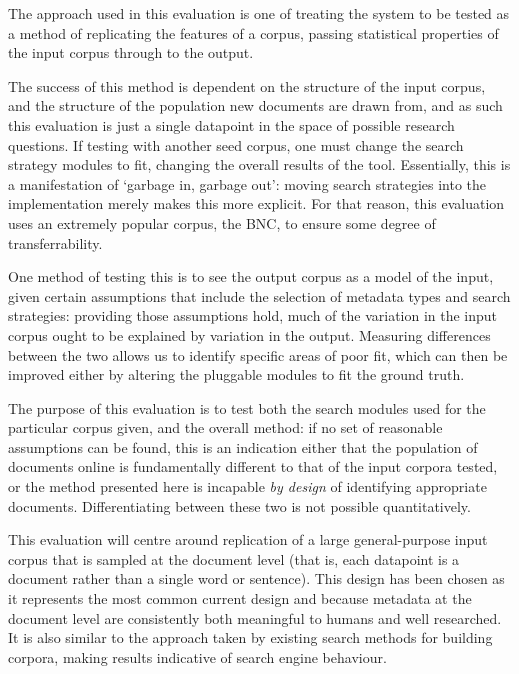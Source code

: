 

The approach used in this evaluation is one of treating the system to be tested as a method of replicating the features of a corpus, passing statistical properties of the input corpus through to the output.

The success of this method is dependent on the structure of the input corpus, and the structure of the population new documents are drawn from, and as such this evaluation is just a single datapoint in the space of possible research questions.  If testing with another seed corpus, one must change the search strategy modules to fit, changing the overall results of the tool.  Essentially, this is a manifestation of `garbage in, garbage out': moving search strategies into the implementation merely makes this more explicit.  For that reason, this evaluation uses an extremely popular corpus, the BNC, to ensure some degree of transferrability.

One method of testing this is to see the output corpus as a model of the input, given certain assumptions that include the selection of metadata types and search strategies: providing those assumptions hold, much of the variation in the input corpus ought to be explained by variation in the output.  Measuring differences between the two allows us to identify specific areas of poor fit, which can then be improved either by altering the pluggable modules to fit the ground truth.

The purpose of this evaluation is to test both the search modules used for the particular corpus given, and the overall method: if no set of reasonable assumptions can be found, this is an indication either that the population of documents online is fundamentally different to that of the input corpora tested, or the method presented here is incapable \textsl{by design} of identifying appropriate documents.  Differentiating between these two is not possible quantitatively.


This evaluation will centre around replication of a large general-purpose input corpus that is sampled at the document level (that is, each datapoint is a document rather than a single word or sentence).  This design has been chosen as it represents the most common current design and because metadata at the document level are consistently both meaningful to humans and well researched.  It is also similar to the approach taken by existing search methods for building corpora, making results indicative of search engine behaviour.


